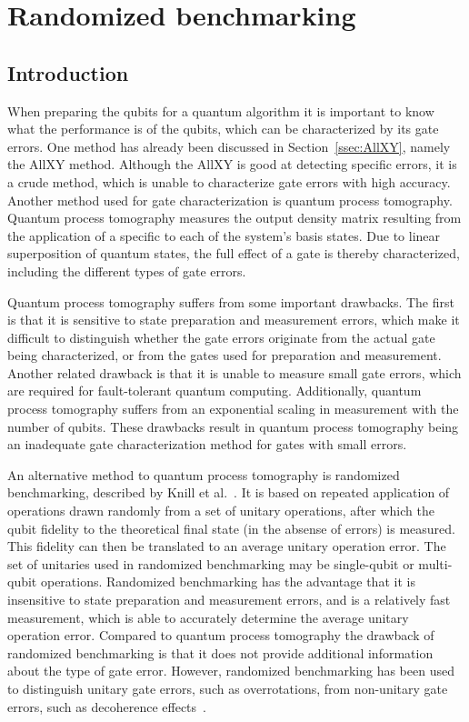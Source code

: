   \chapter{Randomized benchmarking}
    \label{ch:randomized benchmarking}

    \section{Introduction}
      \label{sec:RB introduction}
      When preparing the qubits for a quantum algorithm it is important to know what the performance is of the qubits, which can be characterized by its gate errors. One method has already been discussed in Section~\ref{ssec:AllXY}, namely the AllXY method. Although the AllXY is good at detecting specific errors, it is a crude method, which is unable to characterize gate errors with high accuracy. Another method used for gate characterization is quantum process tomography. Quantum process tomography measures the output density matrix resulting from the application of a specific to each of the system's basis states. Due to linear superposition of quantum states, the full effect of a gate is thereby characterized, including the different types of gate errors.

      Quantum process tomography suffers from some important drawbacks. The first is that it is sensitive to state preparation and measurement errors, which make it difficult to distinguish whether the gate errors originate from the actual gate being characterized, or from the gates used for preparation and measurement. Another related drawback is that it is unable to measure small gate errors, which are required for fault-tolerant quantum computing. Additionally, quantum process tomography suffers from an exponential scaling in measurement with the number of qubits. These drawbacks result in quantum process tomography being an inadequate gate characterization method for gates with small errors.

      An alternative method to quantum process tomography is randomized benchmarking, described by Knill et al.~\cite{knill2008randomized}. It is based on repeated application of operations drawn randomly from a set of unitary operations, after which the qubit fidelity to the theoretical final state (in the absense of errors) is measured. This fidelity can then be translated to an average unitary operation error. The set of unitaries used in randomized benchmarking may be single-qubit or multi-qubit operations. Randomized benchmarking has the advantage that it is insensitive to state preparation and measurement errors, and is a relatively fast measurement, which is able to accurately determine the average unitary operation error. Compared to quantum process tomography the drawback of randomized benchmarking is that it does not provide additional information about the type of gate error. However, randomized benchmarking has been used to distinguish unitary gate errors, such as overrotations, from non-unitary gate errors, such as decoherence effects~\cite{sheldon2015characterizing}.

